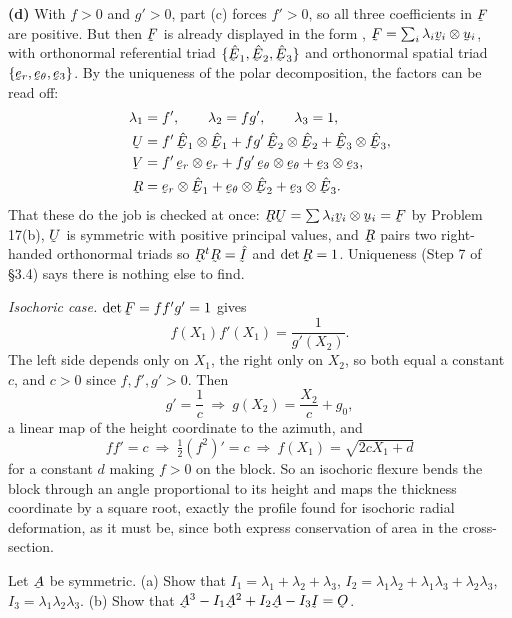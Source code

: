 \begin{solution}
\textbf{(d)} With $f>0$ and $g'>0$, part (c) forces $f'>0$, so all three
coefficients in $\bF$ are positive. But then $\bF$ is already displayed in
the form , $\bF=\sum_{i}\lambda_{i}\bv_{i}\otimes\bu_{i}$, with
orthonormal referential triad $\{\hbE_{1},\hbE_{2},\hbE_{3}\}$ and
orthonormal spatial triad $\{\ber,\bet,\be_{3}\}$. By the uniqueness of
the polar decomposition, the factors can be read off:
\[
\begin{aligned}
   \lambda_{1}&=f',\qquad \lambda_{2}=fg',\qquad \lambda_{3}=1,\\
   \bU&=f'\,\hbE_{1}\otimes\hbE_{1}+fg'\,\hbE_{2}\otimes\hbE_{2}
       +\hbE_{3}\otimes\hbE_{3},\\
   \bV&=f'\,\ber\otimes\ber+fg'\,\bet\otimes\bet+\be_{3}\otimes\be_{3},\\
   \bR&=\ber\otimes\hbE_{1}+\bet\otimes\hbE_{2}+\be_{3}\otimes\hbE_{3}.
\end{aligned}
\]
That these do the job is checked at once: $\bR\bU=\sum\lambda_{i}
\bv_{i}\otimes\bu_{i}=\bF$ by Problem 17(b), $\bU$ is symmetric with
positive principal values, and $\bR$ pairs two right-handed orthonormal
triads so $\bR^{t}\bR=\hI$ and $\det\bR=1$. Uniqueness (Step 7 of
\S3.4) says there is nothing else to find.

\emph{Isochoric case.} $\det\bF=ff'g'=1$ gives
\[
   f(X_{1})f'(X_{1})=\frac{1}{g'(X_{2})} .
\]
The left side depends only on $X_{1}$, the right only on $X_{2}$, so both
equal a constant $c$, and $c>0$ since $f,f',g'>0$. Then
\[
   g'=\frac1c\ \Longrightarrow\ g(X_{2})=\frac{X_{2}}{c}+g_{0},
\]
a linear map of the height coordinate to the azimuth, and
\[
   ff'=c\ \Longrightarrow\ \tfrac12(f^{2})'=c
   \ \Longrightarrow\ f(X_{1})=\sqrt{2cX_{1}+d}
\]
for a constant $d$ making $f>0$ on the block. So an isochoric flexure
bends the block through an angle proportional to its height and maps the
thickness coordinate by a square root, exactly the profile  found
for isochoric radial deformation, as it must be, since both express
conservation of area in the cross-section.
\end{solution}

\begin{problem}
Let $\bA$ be symmetric. (a) Show that
$I_{1}=\lambda_{1}+\lambda_{2}+\lambda_{3}$,
$I_{2}=\lambda_{1}\lambda_{2}+\lambda_{1}\lambda_{3}+\lambda_{2}\lambda_{3}$,
$I_{3}=\lambda_{1}\lambda_{2}\lambda_{3}$.
(b) Show that $\bA^{3}-I_{1}\bA^{2}+I_{2}\bA-I_{3}\I=\Ob$.
\end{problem}

